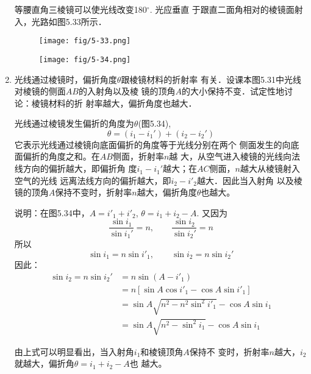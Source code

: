 \begin{enumerate}
\begin{solution}
    等腰直角三棱镜可以使光线改变180$^\circ$. 光应垂直
    于跟直二面角相对的棱镜面射入，光路如图5.33所示．
    \begin{figure}[htp]\centering
        \begin{minipage}[t]{0.48\textwidth}
        \centering
    \texttt{[image: fig/5-33.png]}
        \caption{}
        \end{minipage}
        \begin{minipage}[t]{0.48\textwidth}
        \centering
    \texttt{[image: fig/5-34.png]}
        \caption{}
        \end{minipage}
        \end{figure}
\end{solution}
\item 光线通过棱镜时，偏折角度$\theta$跟棱镜材料的折射率
有关．设课本图5.31中光线对棱镜的侧面$AB$的入射角以及棱
镜的顶角$A$的大小保持不变．试定性地讨论：棱镜材料的折
射率越大，偏折角度也越大．

\begin{solution}
    光线通过棱镜发生偏折的角度为$\theta$(图5.34),
\[  \theta=(i_1-i_1')+(i_2-i_2')\]
    它表示光线通过棱镜向底面偏折的角度等于光线分别在两个
    侧面发生的向底面偏折的角度之和。在$AB$侧面，折射率$n$越
    大，从空气进入棱镜的光线向法线方向的偏折越大，即偏折角
    度$i_1-i_1'$越大；在$AC$侧面，$n$越大从棱镜射入空气的光线
    远离法线方向的偏折越大，即$i_2-i'_2$越大．因此当入射角
    以及棱镜的顶角$A$保持不变时，折射率$n$越大，偏折角度$\theta$也越大。

说明：在图5.34中，$A=i'_1+i'_2$, $\theta=i_1+i_2-A$. 又因为
\[\frac{\sin i_1}{\sin i_1'}=n,\qquad \frac{\sin i_2}{\sin i_2'}=n\]
所以
\[\sin i_1=n\sin i'_1,\qquad \sin i_2=n\sin i_2'\]
因此：
\[\begin{split}
    \sin i_2=n\sin i_2'&=n\sin (A-i'_1)\\
    &=n\left[\sin A\cos i'_1-\cos A\sin i'_1\right]\\
    &=\sin A\sqrt{n^2-n^2\sin^2 i'_1}-\cos A\sin i_1\\
    &=\sin A\sqrt{n^2-\sin^2 i_1}-\cos A\sin i_1
\end{split}\]

由上式可以明显看出，当入射角$i_1$和棱镜顶角$A$保持不
变时，折射率$n$越大，$i_2$就越大，偏折角$\theta=i_1+i_2-A$也
越大。
\end{solution}
\end{enumerate}


